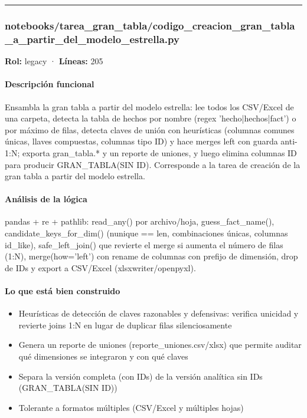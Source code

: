 \medskip
\hrule

\subsubsection{notebooks/tarea\_gran\_tabla/codigo\_creacion\_gran\_tabla\_a\_partir\_del\_modelo\_estrella.py}
\textbf{Rol:} legacy · \textbf{Líneas:} 205

\paragraph{Descripción funcional}
Ensambla la gran tabla a partir del modelo estrella: lee todos los CSV/Excel de una carpeta, detecta la tabla de hechos por nombre (regex 'hecho|hechos|fact') o por máximo de filas, detecta claves de unión con heurísticas (columnas comunes únicas, llaves compuestas, columnas tipo ID) y hace merges left con guarda anti-1:N; exporta gran\_tabla.* y un reporte de uniones, y luego elimina columnas ID para producir GRAN\_TABLA(SIN ID). Corresponde a la tarea de creación de la gran tabla a partir del modelo estrella.

\paragraph{Análisis de la lógica}
pandas + re + pathlib: read\_any() por archivo/hoja, guess\_fact\_name(), candidate\_keys\_for\_dim() (nunique == len, combinaciones únicas, columnas id\_like), safe\_left\_join() que revierte el merge si aumenta el número de filas (1:N), merge(how='left') con rename de columnas con prefijo de dimensión, drop de IDs y export a CSV/Excel (xlsxwriter/openpyxl).

\paragraph{Lo que está bien construido}
\begin{itemize}
  \item Heurísticas de detección de claves razonables y defensivas: verifica unicidad y revierte joins 1:N en lugar de duplicar filas silenciosamente
  \item Genera un reporte de uniones (reporte\_uniones.csv/xlsx) que permite auditar qué dimensiones se integraron y con qué claves
  \item Separa la versión completa (con IDs) de la versión analítica sin IDs (GRAN\_TABLA(SIN ID))
  \item Tolerante a formatos múltiples (CSV/Excel y múltiples hojas)
\end{itemize}

